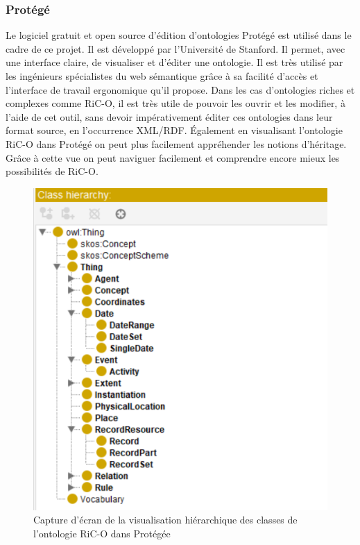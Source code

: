 \subsubsection*{Protégé}
Le logiciel gratuit et open source d'édition d'ontologies Protégé est utilisé dans le cadre de ce projet. Il est développé par l'Université de Stanford. Il permet, avec une interface claire, de visualiser et d'éditer une ontologie. Il est très utilisé par les ingénieurs spécialistes du web sémantique grâce à sa facilité d'accès et l'interface de travail ergonomique qu'il propose. Dans les cas d'ontologies riches et complexes comme RiC-O, il est très utile de pouvoir les ouvrir et les modifier, à l'aide de cet outil, sans devoir impérativement éditer ces ontologies dans leur format source, en l'occurrence XML/RDF. Également en visualisant l'ontologie RiC-O dans Protégé on peut plus facilement appréhender les notions d'héritage. Grâce à cette vue on peut naviguer facilement et comprendre encore mieux les possibilités de RiC-O.
\begin{figure}[ht]
    \centering
    \includegraphics[width=0.6\linewidth]{images/Protégée Classes RiC-O.png}
    \caption{Capture d'écran de la visualisation hiérarchique des classes de l'ontologie RiC-O dans Protégée}
    \label{fig:protegee_classe_rico}
\end{figure}
